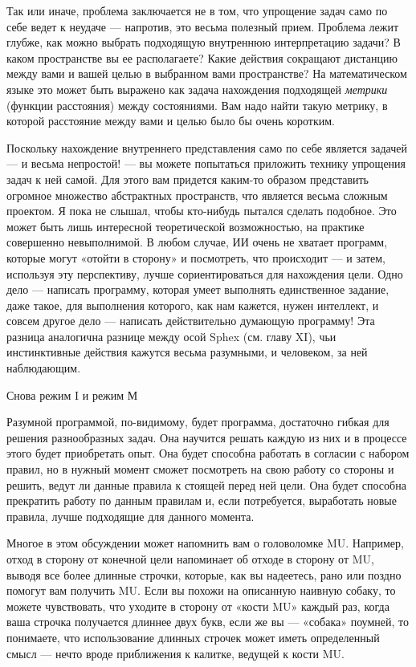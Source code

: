 \documentclass[../main.tex]{subfiles}
\begin{document}
Так или иначе, проблема заключается не в том, что упрощение задач само по себе ведет к неудаче --- напротив, это весьма полезный прием. Проблема лежит глубже, как можно выбрать подходящую внутреннюю интерпретацию задачи? В каком пространстве вы ее располагаете? Какие действия сокращают дистанцию между вами и вашей целью в выбранном вами пространстве? На математическом языке это может быть выражено как задача нахождения подходящей \emph{метрики} (функции расстояния) между состояниями. Вам надо найти такую метрику, в которой расстояние между вами и целью было бы очень коротким.

Поскольку нахождение внутреннего представления само по себе является задачей --- и весьма непростой! --- вы можете попытаться приложить технику упрощения задач к ней самой. Для этого вам придется каким-то образом представить огромное множество абстрактных пространств, что является весьма сложным проектом. Я пока не слышал, чтобы кто-нибудь пытался сделать подобное. Это может быть лишь интересной теоретической возможностью, на практике совершенно невыполнимой. В любом случае, ИИ очень не хватает программ, которые могут «отойти в сторону» и посмотреть, что происходит --- и затем, используя эту перспективу, лучше сориентироваться для нахождения цели. Одно дело --- написать программу, которая умеет выполнять единственное задание, даже такое, для выполнения которого, как нам кажется, нужен интеллект, и совсем другое дело --- написать действительно думающую программу! Эта разница аналогична разнице между осой Sphex (см. главу XI), чьи инстинктивные действия кажутся весьма разумными, и человеком, за ней наблюдающим.

Снова режим I и режим М

Разумной программой, по-видимому, будет программа, достаточно гибкая для решения разнообразных задач. Она научится решать каждую из них и в процессе этого будет приобретать опыт. Она будет способна работать в согласии с набором правил, но в нужный момент сможет посмотреть на свою работу со стороны и решить, ведут ли данные правила к стоящей перед ней цели. Она будет способна прекратить работу по данным правилам и, если потребуется, выработать новые правила, лучше подходящие для данного момента.

Многое в этом обсуждении может напомнить вам о головоломке MU. Например, отход в сторону от конечной цели напоминает об отходе в сторону от MU, выводя все более длинные строчки, которые, как вы надеетесь, рано или поздно помогут вам получить MU. Если вы похожи на описанную наивную собаку, то можете чувствовать, что уходите в сторону от «кости MU» каждый раз, когда ваша строчка получается длиннее двух букв, если же вы --- «собака» поумней, то понимаете, что использование длинных строчек может иметь определенный смысл --- нечто вроде приближения к калитке, ведущей к кости MU.
\end{document}
